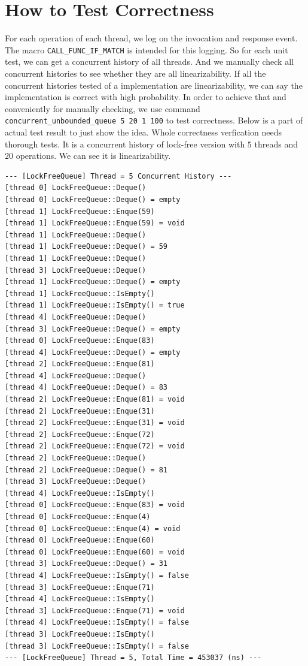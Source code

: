 \documentclass[a4paper]{report}
\begin{document}
\section*{How to Test Correctness}
For each operation of each thread, we log on the invocation and response event. The macro \lstinline{CALL_FUNC_IF_MATCH} is intended for this logging. So for each unit test, we can get a concurrent history of all threads. And we manually check all concurrent histories to see whether they are all linearizability. If all the concurrent histories tested of a implementation are linearizability, we can say the implementation is correct with high probability. In order to achieve that and conveniently for manually checking, we use command \lstinline{concurrent_unbounded_queue 5 20 1 100} to test correctness. Below is a part of actual test result to just show the idea. Whole correctness verfication needs thorough tests. It is a concurrent history of lock-free version with $5$ threads and $20$ operations. We can see it is linearizability.

\begin{lstlisting}[basicstyle=\ttfamily\scriptsize]
--- [LockFreeQueue] Thread = 5 Concurrent History ---
[thread 0] LockFreeQueue::Deque()
[thread 0] LockFreeQueue::Deque() = empty
[thread 1] LockFreeQueue::Enque(59)
[thread 1] LockFreeQueue::Enque(59) = void
[thread 1] LockFreeQueue::Deque()
[thread 1] LockFreeQueue::Deque() = 59
[thread 1] LockFreeQueue::Deque()
[thread 3] LockFreeQueue::Deque()
[thread 1] LockFreeQueue::Deque() = empty
[thread 1] LockFreeQueue::IsEmpty()
[thread 1] LockFreeQueue::IsEmpty() = true
[thread 4] LockFreeQueue::Deque()
[thread 3] LockFreeQueue::Deque() = empty
[thread 0] LockFreeQueue::Enque(83)
[thread 4] LockFreeQueue::Deque() = empty
[thread 2] LockFreeQueue::Enque(81)
[thread 4] LockFreeQueue::Deque()
[thread 4] LockFreeQueue::Deque() = 83
[thread 2] LockFreeQueue::Enque(81) = void
[thread 2] LockFreeQueue::Enque(31)
[thread 2] LockFreeQueue::Enque(31) = void
[thread 2] LockFreeQueue::Enque(72)
[thread 2] LockFreeQueue::Enque(72) = void
[thread 2] LockFreeQueue::Deque()
[thread 2] LockFreeQueue::Deque() = 81
[thread 3] LockFreeQueue::Deque()
[thread 4] LockFreeQueue::IsEmpty()
[thread 0] LockFreeQueue::Enque(83) = void
[thread 0] LockFreeQueue::Enque(4)
[thread 0] LockFreeQueue::Enque(4) = void
[thread 0] LockFreeQueue::Enque(60)
[thread 0] LockFreeQueue::Enque(60) = void
[thread 3] LockFreeQueue::Deque() = 31
[thread 4] LockFreeQueue::IsEmpty() = false
[thread 3] LockFreeQueue::Enque(71)
[thread 4] LockFreeQueue::IsEmpty()
[thread 3] LockFreeQueue::Enque(71) = void
[thread 4] LockFreeQueue::IsEmpty() = false
[thread 3] LockFreeQueue::IsEmpty()
[thread 3] LockFreeQueue::IsEmpty() = false
--- [LockFreeQueue] Thread = 5, Total Time = 453037 (ns) ---
\end{lstlisting}
\end{document}
